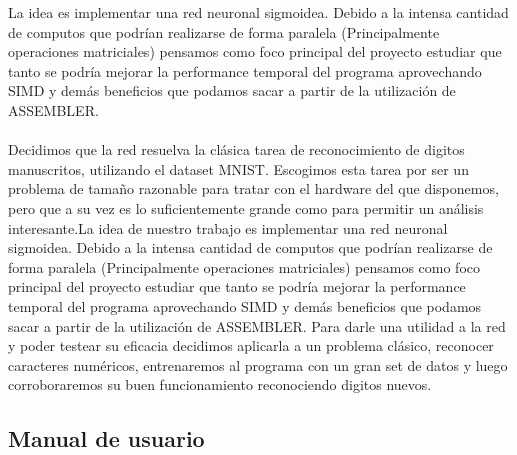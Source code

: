 La idea es implementar una red neuronal sigmoidea. Debido a la intensa cantidad de computos que podrían realizarse de forma paralela (Principalmente operaciones matriciales) pensamos como foco principal del proyecto estudiar que tanto se podría mejorar la performance temporal del programa aprovechando SIMD y demás beneficios que podamos sacar a partir de la utilización de ASSEMBLER.
\\
\\
Decidimos que la red resuelva la clásica tarea de reconocimiento de digitos manuscritos, utilizando el dataset MNIST. Escogimos esta tarea por ser un problema de tamaño razonable para tratar con el hardware del que disponemos, pero que a su vez es lo suficientemente grande como para permitir un análisis interesante.La idea de nuestro trabajo es implementar una red neuronal sigmoidea. Debido a la intensa cantidad de computos que podrían realizarse de forma paralela (Principalmente operaciones matriciales) pensamos como foco principal del proyecto estudiar que tanto se podría mejorar la performance temporal del programa aprovechando SIMD y demás beneficios que podamos sacar a partir de la utilización de ASSEMBLER. Para darle una utilidad a la red y poder testear su eficacia decidimos aplicarla a un problema clásico, reconocer caracteres numéricos, entrenaremos al programa con un gran set de datos y luego corroboraremos su buen funcionamiento reconociendo digitos nuevos.

\subsection{Manual de usuario}

\newpage


